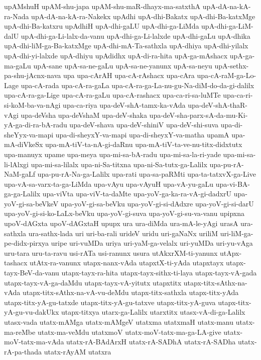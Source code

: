 {upAMshuH
upAM-shu-japa
upAM-shu-maR-dhayx-ma-satxthA
upA-dA-na-kA-ra-Nada
upA-dA-na-kA-ra-Nakekx
upAdhi
upA-dhi-Bakatx
upA-dhi-Ba-katxMge
upA-dhi-Ba-katxru
upAdhiH
upA-dhi-gaLU
upA-dhi-ga-LiMda
upA-dhi-ga-LiM-dalU
upA-dhi-ga-Li-lalx-da-vanu
upA-dhi-ga-Li-lalxde
upA-dhi-gaLu
upA-dhika
upA-dhi-liM-ga-Ba-katxMge
upA-dhi-mA-Ta-sathxla
upA-dhiya
upA-dhi-yilalx
upA-dhi-yi-lalxde
upA-dhiyu
upAdidhx
upA-di-ra-hita
upA-ga-mAshacx
upA-ga-ma-gaLu
upA-sane
upA-sa-ne-gaLu
upA-sa-ne-yanunx
upA-sa-neyu
upA-sethx-pa-shu-jAcnx-nava
upa
upa-cArAH
upa-cA-rAshacx
upa-cAra
upa-cA-raM-ga-Lo-Lage
upa-cA-rada
upa-cA-ra-gaLa
upa-cA-ra-ga-La-nu-gu-Na-diM-do-da-gi-dalilx
upa-cA-ra-ga-Lige
upa-cA-ra-gaLu
upa-cA-rashacx
upa-ca-ri-sa-luMTe
upa-ca-ri-si-koM-ba-va-nAgi
upa-ca-riya
upa-deV-shA-tamx-ka-vAda
upa-deV-shA-thaR-vAgi
upa-deVsha
upa-deVshaM
upa-deV-shaka
upa-deV-sha-parx-sA-da-mu-Ki-yA-ga-di-ra-bA-radu
upa-deV-shava
upa-deV-shiniV
upa-deV-shi-suva
upa-di-sheYyx-va-mapi
upa-di-sheyxY-va-mapi
upa-di-sheyxY-va-matha
upamA
upa-mA-diVkeSx
upa-mA-tiV-ta-nA-gi-daRnu
upa-mA-tiV-ta-ve-nu-titx-didxtutx
upa-manuyx
upame
upa-meya
upa-mi-sa-bA-radu
upa-mi-sa-la-ri-yade
upa-mi-sa-li-lAlxgi
upa-mi-sa-lilalx
upa-ni-Sa-titxna
upa-ni-Sa-tutx-ga-Lalilx
upa-pu-rA-NaM-gaLf
upa-pu-rA-Na-ga-Lalilx
upa-rati
upa-sa-paRMti
upa-ta-tatxvX-ga-Live
upa-vA-sa-varx-ta-ga-LiMda
upa-vAyu
upa-vAyuH
upa-vA-yu-gaLu
upa-vi-BA-ga-ga-Lalilx
upa-viVta
upa-viV-ta-daMte
upa-yoV-ga-ka-ra-vA-gi-dadxrU
upa-yoV-gi-sa-beVkeV
upa-yoV-gi-sa-beVku
upa-yoV-gi-si-dAdxre
upa-yoV-gi-si-darU
upa-yoV-gi-si-ko-LaLx-beVku
upa-yoV-gi-suva
upa-yoV-gi-su-va-vanu
upipxna
upoV-dAGxta
upoV-dAGxtaH
upupx
ura
ura-diMda
ura-mA-le-yAgi
urasA
ura-sathxla
ura-sathx-lada
uri
uri-ba-rali
urideV
uridu
uri-gaNaNx
uriliM
uri-liM-ga-pe-didx-pirxya
uripe
uri-vuMDa
uriya
uri-yaM-ga-velalx
uri-yuMDa
uri-yu-vAga
uru-tara
uru-ta-ravu
usi-rATa
usi-ranunx
usura
utAkxrXM-ti-yanunx
utApx-tashacx
utAtx-ra-vanunx
utapx-nanx-vAda
utapxtX-ti-yAda
utapxtayx
utapx-tayx-BeV-da-vanu
utapx-tayx-ra-hita
utapx-tayx-sithx-ti-laya
utapx-tayx-vA-gada
utapx-tayx-vA-ga-daMdu
utapx-tayx-vA-yitutx
utapxtitx
utapx-titx-sAthx-na-vAda
utapx-titx-sAthx-na-vA-vu-deMdu
utapx-titx-sathxla
utapx-titx-yAda
utapx-titx-yA-gu-tatxde
utapx-titx-yA-gu-tatxve
utapx-titx-yA-guva
utapx-titx-yA-gu-vu-dakUkx
utapx-titxya
utarx-ga-Lalilx
utarxtitx
utasx-vA-di-ga-Lalilx
utasx-vada
utatx-mAMga
utatx-mAMgeV
utatxma
utatxmaH
utatx-manu
utatx-ma-reMbe
utatx-ma-veMdu
utatxmoV
utatx-moV-tatx-ma-ga-LA-give
utatx-moV-tatx-ma-vAda
utatx-rA-BAdArxH
utatx-rA-SADhA
utatx-rA-SADha
utatx-rA-pa-thada
utatx-rAyAM
utatxra
}
